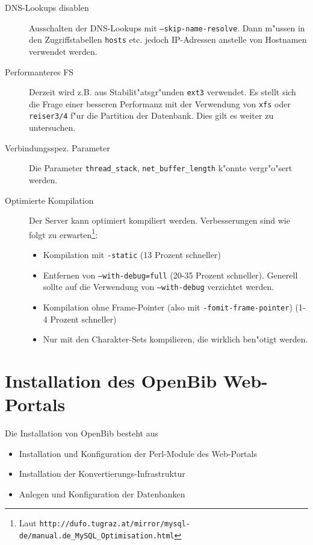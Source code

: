 \documentclass[11pt, twoside, a4paper, BCOR8mm, DIV12, bibtotoc,idxtotoc]{scrbook}
\begin{document}
\begin{description}
\item[DNS-Lookups disablen] Ausschalten der DNS-Lookups mit
  \texttt{--skip-name-resolve}. Dann m"ussen in den Zugriffstabellen
  \texttt{hosts} etc. jedoch IP-Adressen anstelle von Hostnamen
  verwendet werden.
\item[Performanteres FS] Derzeit wird z.B. aus Stabilit"atsgr"unden
  \texttt{ext3} verwendet. Es stellt sich die Frage einer besseren
  Performanz mit der Verwendung von \texttt{xfs} oder
  \texttt{reiser3/4} f"ur die Partition der Datenbank. Dies gilt es
  weiter zu untersuchen.
\item[Verbindungsspez. Parameter] Die Parameter \texttt{thread\_stack},
  \texttt{net\_buffer\_length} k"onnte ver\-gr"o\-"sert werden.
\item[Optimierte Kompilation] Der Server kann optimiert kompiliert
  werden. Verbesserungen sind wie folgt zu erwarten\footnote{Laut
    \texttt{http://dufo.tugraz.at/mirror/mysql-de/manual.de\_MySQL\_Optimisation.html}}:

  \begin{itemize}
    \item Kompilation mit \texttt{-static} (13 Prozent schneller)
    \item Entfernen von \texttt{--with-debug=full} (20-35 Prozent
      schneller). Generell sollte auf die Verwendung von \texttt{--with-debug} verzichtet
      werden.
    \item Kompilation ohne Frame-Pointer (also mit
      \texttt{-fomit-frame-pointer}) (1-4 Prozent schneller)
    \item Nur mit den Charakter-Sets kompilieren, die wirklich ben"otigt werden. 
  \end{itemize}
\end{description}

\chapter{Installation des OpenBib Web-Portals}

Die Installation von OpenBib besteht aus

\begin{itemize}
\item Installation und Konfiguration der Perl-Module des Web-Portals
\item Installation der Konvertierungs-Infrastruktur
\item Anlegen und Konfiguration der Datenbanken
\end{itemize}
\end{document}
